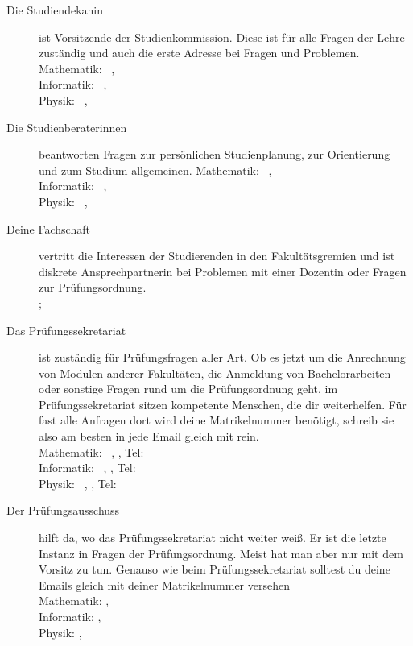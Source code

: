 \begin{description}
    \item[Die Studiendekanin] ist Vorsitzende der Studienkommission. Diese ist für alle Fragen der Lehre zuständig und auch die erste Adresse bei Fragen und Problemen.
    Mathematik: \studiendekanmathe\ , \email{\studiendekanmatheemail} \\
    Informatik: \studiendekaninformatik\ , \email{\studiendekaninformatikemail} \\
    Physik: \studiendekanphysik\ , \email{\studiendekanphysikemail} \\

    \item[Die Studienberaterinnen] beantworten Fragen zur persönlichen Studienplanung, zur Orientierung und zum Studium allgemeinen.
    Mathematik: \studienberatungmathe\ , \email{\studienberatungmatheemail} \\
    Informatik: \studienberatunginformatik\ , \email{\studienberatunginformatikemail} \\
    Physik: \studienberatungphysikersti\ , \email{\studienberatungphysikemail}\\

    \item[Deine Fachschaft] vertritt die Interessen der Studierenden in den Fakultätsgremien und ist diskrete Ansprechpartnerin bei Problemen mit einer Dozentin oder Fragen zur Prüfungsordnung. \\\fsraum; 

    \item[Das Prüfungssekretariat] ist zuständig für Prüfungsfragen aller Art. Ob es jetzt um die Anrechnung von Modulen anderer Fakultäten, die Anmeldung von Bachelorarbeiten oder sonstige Fragen rund um die Prüfungsordnung geht, im Prüfungssekretariat sitzen kompetente Menschen, die dir weiterhelfen. Für fast alle Anfragen dort wird deine Matrikelnummer benötigt, schreib sie also am besten in jede Email gleich mit rein. \\
    Mathematik: \pruefsekmathe\ , \email{\pruefsekmatheemail} , Tel: \pruefsekmathetel\\
    Informatik: \pruefsekinfo\ , \email{\pruefsekinfoemail} , Tel: \pruefsekinfotel \\
    Physik: \pruefsekphysik\ , \email{\pruefsekphysikemail} , Tel: \pruefsekphysiktel \\

    \item[Der Prüfungsausschuss] hilft da, wo das Prüfungssekretariat nicht weiter weiß. Er ist die letzte Instanz in Fragen der Prüfungsordnung. Meist hat man aber nur mit dem Vorsitz zu tun. Genauso wie beim Prüfungssekretariat solltest du deine Emails gleich mit deiner Matrikelnummer versehen\\
    Mathematik: \pruefausschussvorsitzmathe , \email{\pruefausschussvorsitzmatheemail} \\
    Informatik: \pruefausschussvorsitzinformatik , \email{\pruefausschussvorsitzinformatikemail} \\
    Physik: \pruefausschussvorsitzphysik , \email{\pruefausschussvorsitzphysikemail} \\


\end{description}
